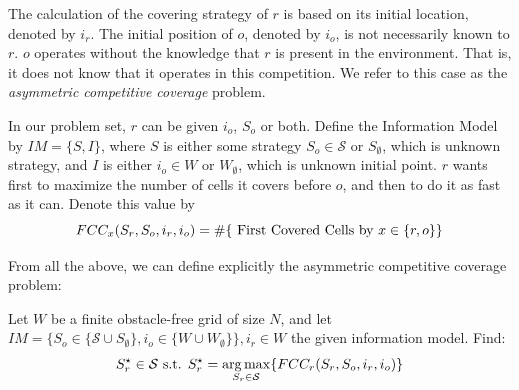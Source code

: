\documentclass[a4paper,english,10pt]{article}
\newcommand\rob{\ensuremath{r}\xspace}
\newcommand\opp{\ensuremath{o}\xspace}
\newcommand{\w}{\ensuremath{W}\xspace}
\newcommand{\fcc}{\ensuremath{FCC}\xspace}
\DeclareMathOperator*{\argmax}{arg\,max} %
\begin{document}
The calculation of the covering strategy of \rob is based on its initial location, denoted by $i_r$. The initial position of \opp, denoted by $i_\opp$, is not necessarily known to \rob.
\opp operates without the knowledge that \rob is present in the environment. That is, it does not know that it operates in this competition. We refer to this case as the {\em asymmetric competitive coverage} problem. %

In our problem set, \rob can be given $i_\opp$, $S_\opp$ or both. Define the Information Model by $IM=\lbrace S,I\rbrace$, where $S$ is either some strategy $S_\opp\in \mathcal{S}$ or $S_\emptyset$, which is unknown strategy, and $I$ is either $i_\opp\in W$ or $\w_{\emptyset}$, which is unknown initial point. \rob wants first to maximize the number of cells it covers before \opp, and then to do it as fast as it can. Denote this value by  
\[
\fcc_{x}(S_\rob, S_\opp, i_\rob, i_\opp )=
\# \lbrace \textnormal{ First Covered Cells by } x \in \lbrace\rob,\opp\rbrace \rbrace 
\]

From all the above, we can define explicitly the asymmetric competitive coverage problem:

\begin{mdframed}[backgroundcolor=gray!20] 
Let \w be a finite obstacle-free grid of size $N$, and let $IM=\lbrace S_\opp\in \lbrace \mathcal{S}\cup S_{\emptyset} \rbrace,i_\opp\in \lbrace \w \cup \w_{\emptyset} \rbrace \rbrace,i_\rob\in\w$ the given information model. Find: \[ S_\rob^\star \in \mathcal{S} \textnormal{ s.t. } S_\rob^\star =\argmax_{S_\rob\in\mathcal{S}} \lbrace \fcc_{r}(S_\rob, S_\opp, i_\rob, i_\opp ) \rbrace\]
\end{mdframed}

\end{document}
